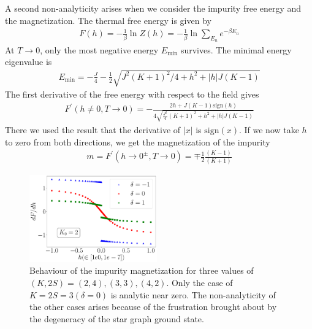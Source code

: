 \documentclass[reprint,prb,superscriptaddress]{revtex4-2}
\begin{document}
A second non-analyticity arises when we consider the impurity free energy and the magnetization. The thermal free energy is given by
\begin{equation}\begin{aligned}
	F(h) = -\frac{1}{\beta}\ln Z(h) = -\frac{1}{\beta}\ln\sum_{E_n}e^{-\beta E_n}
\end{aligned}\end{equation}
At \(T \to 0\), only the most negative energy \(E_\text{min}\) survives. The minimal energy eigenvalue is
\begin{equation}\begin{aligned}
	E_\text{min} = - \frac{J}{4} - \frac{1}{2}\sqrt{J^2(K+1)^2/4 + h^2 + |h|J(K-1)}
\end{aligned}\end{equation}
The first derivative of the free energy with respect to the field gives
\begin{equation}\begin{aligned}
	F^\prime(h\neq 0, T\to 0) =- \frac{2h + J(K-1)\text{sign}(h)}{4\sqrt{\frac{J^2}{4}(K+1)^2 + h^2 + |h|J(K-1)}}
\end{aligned}\end{equation}
There we used the result that the derivative of \(|x|\) is \(\text{sign}(x)\). If we now take \(h\) to zero from both directions, we get the magnetization of the impurity
\begin{equation}\begin{aligned}
	m = F^\prime(h \to 0^\pm, T\to 0) = \mp \frac{1}{2}\frac{(K-1)}{(K+1)}
\end{aligned}\end{equation}
\begin{figure}[!htpb]
	\centering
	\includegraphics[width=0.49\textwidth]{plt/disc_mag_imp_gen.pdf}
	\caption{Behaviour of the impurity magnetization for three values of \(\left(K, 2S\right) = \left(2, 4\right), \left( 3,3 \right), \left(4, 2\right)  \). Only the case of \(K=2S=3 \left(\delta=0\right)\) is analytic near zero. The non-analyticity of the other cases arises because of the frustration brought about by the degeneracy of the star graph ground state.}
	\label{mag_crit}
\end{figure}
\end{document}

